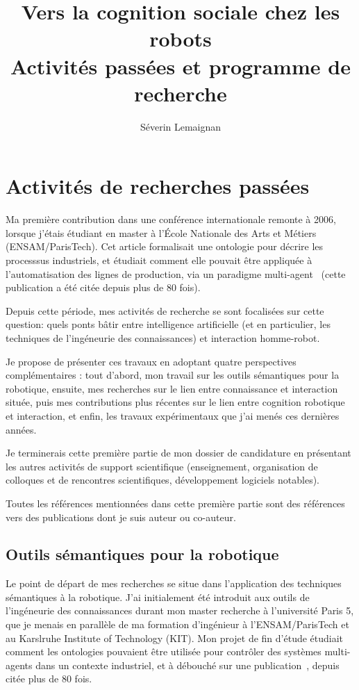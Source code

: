 \documentclass[a4paper]{article}
\title{Vers la cognition sociale chez les robots \\ {\large Activités passées et
programme de recherche}}
\author{Séverin Lemaignan}
\date{}
\begin{document}
\maketitle

\section{Activités de recherches passées}
\newrefsection

Ma première contribution dans une conférence internationale remonte à 2006,
lorsque j'étais étudiant en master à l'École Nationale des Arts et Métiers
(ENSAM/ParisTech). Cet article formalisait une ontologie pour décrire les
processsus industriels, et étudiait comment elle pouvait être appliquée à
l'automatisation des lignes de production, via un paradigme
multi-agent~\cite{lemaignan2006mason} (cette publication a été citée depuis
plus de 80 fois).

Depuis cette période, mes activités de recherche se sont focalisées sur cette
question: quels ponts bâtir entre intelligence artificielle (et en particulier,
les techniques de l'ingéneurie des connaissances) et interaction homme-robot.

Je propose de présenter ces travaux en adoptant quatre perspectives
complémentaires : tout d'abord, mon travail sur les outils sémantiques pour la
robotique, ensuite, mes recherches sur le lien entre connaissance et
interaction située, puis mes contributions plus récentes sur le lien entre
cognition robotique et interaction, et enfin, les travaux expérimentaux que
j'ai menés ces dernières années.

Je terminerais cette première partie de mon dossier de candidature en
présentant les autres activités de support scientifique (enseignement,
organisation de colloques et de rencontres scientifiques, développement
logiciels notables).

Toutes les références mentionnées dans cette première partie sont des références
vers des publications dont je suis auteur ou co-auteur.

\subsection{Outils sémantiques pour la robotique%
  \label{semantic-tools-for-robotics}%
}

Le point de départ de mes recherches se situe dans l'application des techniques
sémantiques à la robotique. J'ai initialement été introduit aux outils de
l'ingéneurie des connaissances durant mon master recherche à l'université Paris
5, que je menais en parallèle de ma formation d'ingénieur à l'ENSAM/ParisTech et
au Karslruhe Institute of Technology (KIT). Mon projet de fin d'étude étudiait
comment les ontologies pouvaient être utilisée pour contrôler des systèmes
multi-agents dans un contexte industriel, et à débouché sur une
publication~\cite{lemaignan2006mason}, depuis citée plus de 80 fois.
\end{document}
